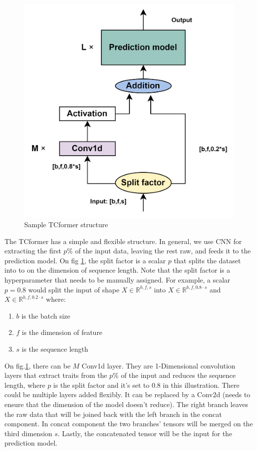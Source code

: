 \documentclass[stu,12pt,floatsintext]{apa7}
\begin{document}
\begin{figure}[H]
    \centering
    \includegraphics[width=0.8\linewidth]{images/StructureDiagram.drawio.png}
    \caption{Sample TCformer structure}
    \label{fig:Sample TCformer structure}
\end{figure}

The TCformer has a simple and flexible structure. In general, we use CNN for extracting the first $p\%$ of the input data, leaving the rest raw, and feeds it to the prediction model. On fig \ref{fig:Sample TCformer structure}, the split factor is a scalar $p$ that splits the dataset into to on the dimension of sequence length. Note that the split factor is a hyperparameter that needs to be manually assigned. For example, a scalar $p=0.8$ would split the input of shape $X\in \mathbb{R}^{b,f,s}$ into $X\in \mathbb{R}^{b,f,0.8\cdot s}$ and $X\in \mathbb{R}^{b,f,0.2\cdot s}$ where:

\begin{enumerate}
    \item $b$ is the batch size
    \item $f$ is the dimension of feature
    \item $s$ is the sequence length
\end{enumerate}

On fig.\ref{fig:Sample TCformer structure}, there can be $M$ Conv1d layer. They are 1-Dimensional convolution layers that extract traits from the $p\%$ of the input and reduces the sequence length, where $p$ is the split factor and it's set to $0.8$ in this illustration. There could be multiple layers added flexibly. It can be replaced by a Conv2d (needs to ensure that the dimension of the model doesn't reduce). The right branch leaves the raw data that will be joined back with the left branch in the concat component. In concat component the two branches' tensors will be merged on the third dimension $s$. Lastly, the concatenated tensor will be the input for the prediction model. 
\end{document}
